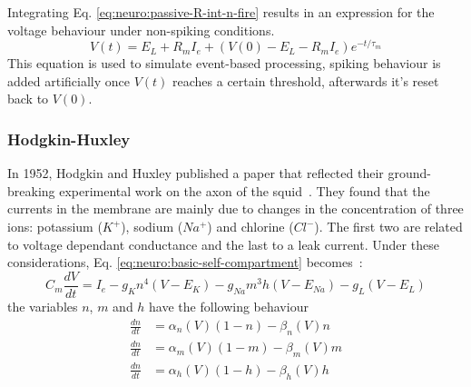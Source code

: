 Integrating Eq. \ref{eq:neuro:passive-R-int-n-fire} results in an expression for the voltage behaviour under non-spiking conditions. 
\begin{equation}
V\left( t \right) = E_{L} + R_{m}I_{e} + 
                    \left( V\left( 0 \right) - E_{L} - R_{m}I_{e}\right) e^{ -t/\tau_{m}}
\label{eq:neuro:passive-V-int-n-fire}
\end{equation}
This equation is used to simulate event-based processing, spiking behaviour is added artificially once $V(t)$ reaches a certain threshold, afterwards it's reset back to $V(0)$.


\subsubsection{Hodgkin-Huxley}
In 1952, Hodgkin and Huxley published a paper that reflected their ground-breaking experimental work on the axon of the squid~\cite{hodgkin-huxley}. They found that the currents in the membrane are mainly due to changes in the concentration of three ions: potassium ($K^{+}$), sodium ($Na^{+}$) and chlorine ($Cl^{-}$). The first two are related to voltage dependant conductance and the last to a leak current. Under these considerations, Eq. \ref{eq:neuro:basic-self-compartment} becomes~\cite{dynamical-systems-Izhikevich2007}:
\begin{equation}
C_{m}\frac{dV}{dt} = I_{e} - g_{K}  n^{4} (V - E_{K}) 
                           - g_{Na} m^{3}h(V - E_{Na})
                           - g_{L}        (V - E_{L})
\label{eq:neuro:hodgkin-huxley}
\end{equation}
the variables $n$, $m$ and $h$ have the following behaviour
\begin{align}
\frac{dn}{dt} &= \alpha_{n}(V) (1 - n) - \beta_{n}(V) n \\[0.5em]
\frac{dn}{dt} &= \alpha_{m}(V) (1 - m) - \beta_{m}(V) m\\[0.5em]
\frac{dn}{dt} &= \alpha_{h}(V) (1 - h) - \beta_{h}(V) h
\end{align}


